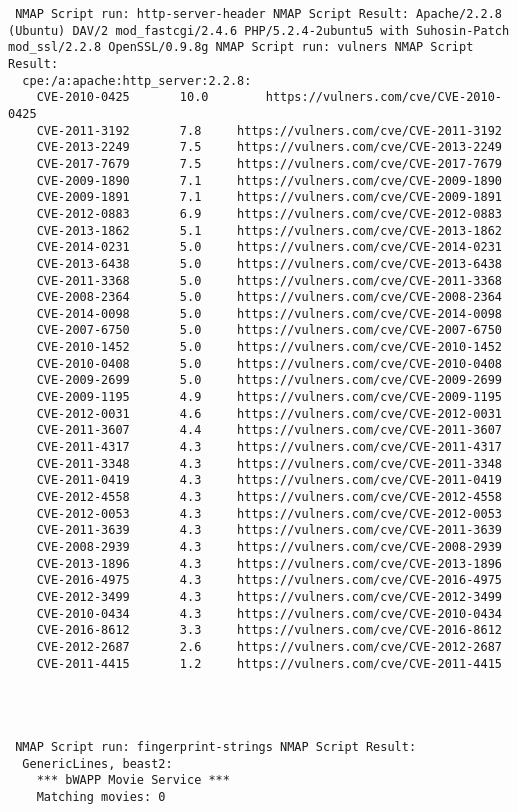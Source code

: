 \documentclass[12pt]{report}
\begin{document}
\begin{lstlisting}
 NMAP Script run: http-server-header NMAP Script Result: Apache/2.2.8 (Ubuntu) DAV/2 mod_fastcgi/2.4.6 PHP/5.2.4-2ubuntu5 with Suhosin-Patch mod_ssl/2.2.8 OpenSSL/0.9.8g NMAP Script run: vulners NMAP Script Result: 
  cpe:/a:apache:http_server:2.2.8: 
	CVE-2010-0425		10.0		https://vulners.com/cve/CVE-2010-0425
	CVE-2011-3192		7.8		https://vulners.com/cve/CVE-2011-3192
	CVE-2013-2249		7.5		https://vulners.com/cve/CVE-2013-2249
	CVE-2017-7679		7.5		https://vulners.com/cve/CVE-2017-7679
	CVE-2009-1890		7.1		https://vulners.com/cve/CVE-2009-1890
	CVE-2009-1891		7.1		https://vulners.com/cve/CVE-2009-1891
	CVE-2012-0883		6.9		https://vulners.com/cve/CVE-2012-0883
	CVE-2013-1862		5.1		https://vulners.com/cve/CVE-2013-1862
	CVE-2014-0231		5.0		https://vulners.com/cve/CVE-2014-0231
	CVE-2013-6438		5.0		https://vulners.com/cve/CVE-2013-6438
	CVE-2011-3368		5.0		https://vulners.com/cve/CVE-2011-3368
	CVE-2008-2364		5.0		https://vulners.com/cve/CVE-2008-2364
	CVE-2014-0098		5.0		https://vulners.com/cve/CVE-2014-0098
	CVE-2007-6750		5.0		https://vulners.com/cve/CVE-2007-6750
	CVE-2010-1452		5.0		https://vulners.com/cve/CVE-2010-1452
	CVE-2010-0408		5.0		https://vulners.com/cve/CVE-2010-0408
	CVE-2009-2699		5.0		https://vulners.com/cve/CVE-2009-2699
	CVE-2009-1195		4.9		https://vulners.com/cve/CVE-2009-1195
	CVE-2012-0031		4.6		https://vulners.com/cve/CVE-2012-0031
	CVE-2011-3607		4.4		https://vulners.com/cve/CVE-2011-3607
	CVE-2011-4317		4.3		https://vulners.com/cve/CVE-2011-4317
	CVE-2011-3348		4.3		https://vulners.com/cve/CVE-2011-3348
	CVE-2011-0419		4.3		https://vulners.com/cve/CVE-2011-0419
	CVE-2012-4558		4.3		https://vulners.com/cve/CVE-2012-4558
	CVE-2012-0053		4.3		https://vulners.com/cve/CVE-2012-0053
	CVE-2011-3639		4.3		https://vulners.com/cve/CVE-2011-3639
	CVE-2008-2939		4.3		https://vulners.com/cve/CVE-2008-2939
	CVE-2013-1896		4.3		https://vulners.com/cve/CVE-2013-1896
	CVE-2016-4975		4.3		https://vulners.com/cve/CVE-2016-4975
	CVE-2012-3499		4.3		https://vulners.com/cve/CVE-2012-3499
	CVE-2010-0434		4.3		https://vulners.com/cve/CVE-2010-0434
	CVE-2016-8612		3.3		https://vulners.com/cve/CVE-2016-8612
	CVE-2012-2687		2.6		https://vulners.com/cve/CVE-2012-2687
	CVE-2011-4415		1.2		https://vulners.com/cve/CVE-2011-4415




 NMAP Script run: fingerprint-strings NMAP Script Result: 
  GenericLines, beast2: 
    *** bWAPP Movie Service ***
    Matching movies: 0




\end{lstlisting}
\end{document}
